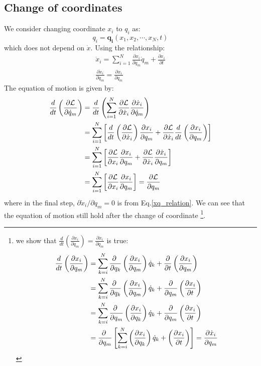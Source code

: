 \documentclass{article}
\newcommand{\pfrac}[2]{\frac{\partial #1}{\partial #2}}
\newcommand{\ddt}[1]{\frac{d}{dt}\left( #1 \right)}
\renewcommand{\L}{\mathcal{L}}
\newcommand{\dotx}{\dot{x}}
\newcommand{\dotq}{\dot{q}}
\begin{document}
\subsection{Change of coordinates}
We consider changing coordinate ${x_i}$ to ${q_i}$ as:
\begin{equation}
    q_i = \mathbf{q_i} (x_1, x_2 , \cdots, x_N, t)
\end{equation}
which does not depend on $\dotx$. Using the relationship:
\begin{gather}
    \dotx_i = \sum_{i=1}^N \pfrac{x_i}{q_m} \dotq_m + \pfrac{x_i}{t} \label{xq_relation}\\
    \pfrac{\dotx_i}{\dotq_m} = \pfrac{x_i}{q_m}
\end{gather}
The equation of motion is
given by:
\begin{align}
    \frac{d}{dt}\left( \frac{\partial \L}{\partial \dotq_m} \right)
    &=  \frac{d}{dt}\left( \sum_{i=1}^N \pfrac{\L}{\dotx_i} \pfrac{\dotx_i}{\dotq_m} \right) \notag \\
    &=  \sum_{i=1}^N \left[ \ddt{\pfrac{\L}{\dotx_i}} \pfrac{x_i}{q_m} + \pfrac{\L}{\dotx_i}\ddt{\pfrac{x_i}{q_m}} \right] \notag \\
    &=  \sum_{i=1}^N \left[ \pfrac{\L}{x_i} \pfrac{x_i}{q_m} + \pfrac{\L}{\dotx_i} \pfrac{\dotx_i}{q_m} \right] \notag \\
    &=  \sum_{i=1}^N \left[ \pfrac{\L}{x_i} \pfrac{x_i}{q_m} \right] = \pfrac{\L}{q_m}
\end{align}
where in the final step, $\partial \dotx_i / \partial q_m = 0$ is from Eq.\ref{xq_relation}. We can see that the 
equation of motion still hold after the change of coordinate
\footnote{
we show that $\ddt{\pfrac{x_i}{q_m}} = \pfrac{\dotx_i}{q_m}$ is true:
\begin{align}
    \ddt{\pfrac{x_i}{q_m}} 
    &= \sum_{k=i}^N \pfrac{\ }{q_k} \left( \pfrac{x_i}{q_m} \right) \dotq_k + \pfrac{}{t} \left( \pfrac{x_i}{q_m} \right) \notag \\
    &= \sum_{k=i}^N \pfrac{\ }{q_k} \left( \pfrac{x_i}{q_m} \right) \dotq_k + \pfrac{}{q_m} \left( \pfrac{x_i}{t} \right) \notag \\
    &= \sum_{k=i}^N \pfrac{\ }{q_m} \left( \pfrac{x_i}{q_k} \right) \dotq_k + \pfrac{}{q_m} \left( \pfrac{x_i}{t} \right) \notag \\
    &= \pfrac{\ }{q_m} \left[ \sum_{k=i}^N  \left( \pfrac{x_i}{q_k} \right) \dotq_k + \left( \pfrac{x_i}{t} \right) \right] = \pfrac{\dotx_i}{q_m}\notag \\
\end{align}
}.
\end{document}
